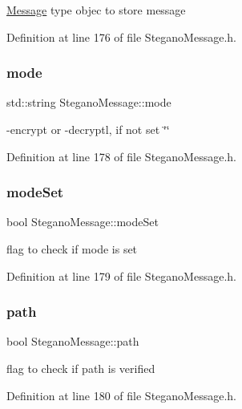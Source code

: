 \mbox{\hyperlink{classMessage}{Message}} type objec to store message 

Definition at line 176 of file Stegano\+Message.\+h.

\mbox{\label{classSteganoMessage_a8772194b7823da730648f8d4c06334a8}} 
\subsubsection{\texorpdfstring{mode}{mode}}
{\footnotesize\ttfamily std\+::string Stegano\+Message\+::mode\hspace{0.3cm}{\ttfamily [private]}}

-\/encrypt or -\/decryptl, if not set \char`\"{}\char`\"{} 

Definition at line 178 of file Stegano\+Message.\+h.

\mbox{\label{classSteganoMessage_ae1da17c621a8db71fa4eb3b148a82ceb}} 
\subsubsection{\texorpdfstring{modeSet}{modeSet}}
{\footnotesize\ttfamily bool Stegano\+Message\+::mode\+Set\hspace{0.3cm}{\ttfamily [private]}}

flag to check if mode is set 

Definition at line 179 of file Stegano\+Message.\+h.

\mbox{\label{classSteganoMessage_a399f4c181d3b7b15ccdb5c925a7a1f51}} 
\subsubsection{\texorpdfstring{path}{path}}
{\footnotesize\ttfamily bool Stegano\+Message\+::path\hspace{0.3cm}{\ttfamily [private]}}

flag to check if path is verified 

Definition at line 180 of file Stegano\+Message.\+h.

